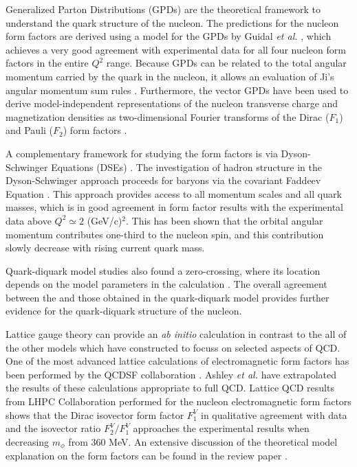 \documentclass[12pt]{article}
\begin{document}
Generalized Parton Distributions (GPDs) are the theoretical framework to understand the quark structure of the nucleon. The predictions for the nucleon form factors are derived using a model for the GPDs by Guidal \emph{et al.} \cite{123}, which achieves a very good agreement with experimental data for all four nucleon form factors in the entire $Q^2$ range. Because GPDs can be related to the total angular momentum carried by the quark in the nucleon, it allows an evaluation of Ji's angular momentum sum rules \cite{124}. Furthermore, the vector GPDs have been used to derive model-independent representations of the nucleon transverse charge and magnetization densities as two-dimensional Fourier transforms of the Dirac ($F_1$) and Pauli ($F_2$) form factors \cite{125}.

A complementary framework for studying the form factors is via Dyson-Schwinger Equations (DSEs) \cite{126, 127}. The investigation of hadron structure in the Dyson-Schwinger approach proceeds for baryons via the covariant Faddeev Equation \cite{128, 129}. This approach provides access to all momentum scales and all quark masses, which is in good agreement in form factor results with the experimental data above $Q^2\simeq2$ (GeV/c)$^2$. This has been shown that the orbital angular momentum contributes one-third to the nucleon spin, and this contribution slowly decrease with rising current quark mass.

 Quark-diquark model studies also found a zero-crossing, where its location depends on the model parameters in the calculation \cite{130, 131}. The overall agreement between the \cite{129} and those obtained in the quark-diquark model provides further evidence for the quark-diquark structure of the nucleon.

Lattice gauge theory can provide an \emph{ab initio} calculation in contrast to the all of the other models which have constructed to focuss on selected aspects of QCD. One of the most advanced lattice calculations of electromagnetic form factors has been performed by the QCDSF collaboration \cite{132}. Ashley \emph{et al.} \cite{133} have extrapolated the results of these calculations appropriate to full QCD. Lattice QCD results from LHPC Collaboration \cite{134} performed for the nucleon electromagnetic form factors shows that the Dirac isovector form factor $F_1^V$ in qualitative agreement with data and the isovector ratio $F_2^V/F_1^V$ approaches the experimental results when decreasing $m_{\phi}$ from 360 MeV. An extensive discussion of the theoretical model explanation on the form factors can be found in the review paper \cite{135}.
\end{document}
